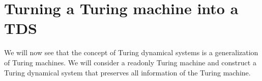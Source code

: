 \section{Turning a Turing machine into a TDS}
\label{tm_to_tds}

We will now see that the concept of Turing dynamical systems is a generalization of Turing machines.
We will consider a readonly Turing machine and construct a Turing dynamical system that preserves all information of the Turing machine.





